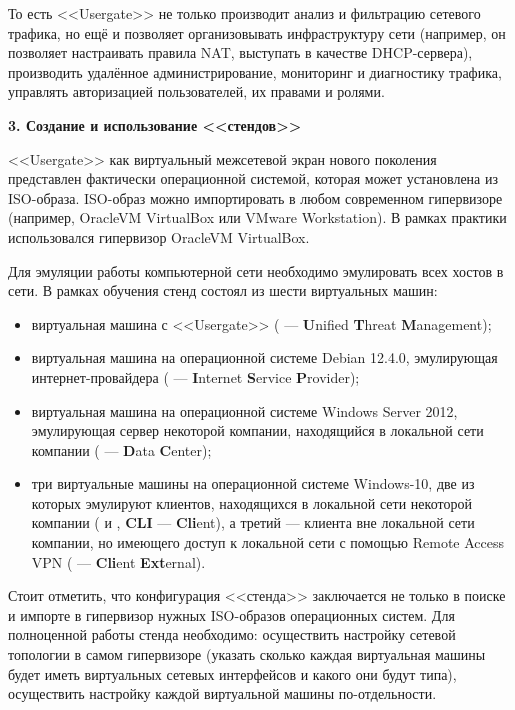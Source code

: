 То есть <<Usergate>> не только производит анализ и фильтрацию сетевого трафика, но ещё и позволяет организовывать инфраструктуру сети (например, он позволяет настраивать правила NAT, выступать в качестве DHCP-сервера), производить удалённое администрирование, мониторинг и диагностику трафика, управлять авторизацией пользователей, их правами и ролями.

\begin{center}
	\textbf{\Large 3. Создание и использование <<стендов>>}
\end{center}

<<Usergate>> как виртуальный межсетевой экран нового поколения представлен фактически операционной системой, которая может установлена из ISO-образа. ISO-образ можно импортировать в любом современном гипервизоре (например, OracleVM VirtualBox или VMware Workstation). В рамках практики использовался гипервизор OracleVM VirtualBox.
		
Для эмуляции работы компьютерной сети необходимо эмулировать всех хостов в сети. В рамках обучения стенд состоял из шести виртуальных машин:
		
\begin{itemize}
	\item виртуальная машина с <<Usergate>> (\UTM{} --- \textbf{U}nified \textbf{T}hreat \textbf{M}anagement);
			
	\item виртуальная машина на операционной системе Debian 12.4.0, эмулирующая интернет-провайдера (\ISP{} --- \textbf{I}nternet \textbf{S}ervice \textbf{P}rovider);
			
	\item виртуальная машина на операционной системе Windows Server 2012, эмулирующая сервер некоторой компании, находящийся в локальной сети компании (\DC{} --- \textbf{D}ata \textbf{C}enter);
			
	\item три виртуальные машины на операционной системе Windows-10, две из которых эмулируют клиентов, находящихся в локальной сети некоторой компании (\CLIA{} и \CLIB{}, \textbf{CLI} --- \textbf{Cli}ent), а третий --- клиента вне локальной сети компании, но имеющего доступ к локальной сети с помощью Remote Access VPN (\CLIEXT{} --- \textbf{Cli}ent \textbf{Ext}ernal).
\end{itemize}
		
Стоит отметить, что конфигурация <<стенда>> заключается не только в поиске и импорте в гипервизор нужных ISO-образов операционных систем. Для полноценной работы стенда необходимо: осуществить настройку сетевой топологии в самом гипервизоре (указать сколько каждая виртуальная машины будет иметь виртуальных сетевых интерфейсов и какого они будут типа), осуществить настройку каждой виртуальной машины по-отдельности. 
		
